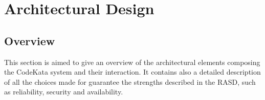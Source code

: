 \clearpage
\section{Architectural Design}
\subsection{Overview}

This section is aimed to give an overview of the architectural elements composing the CodeKata system and their interaction. It contains also a detailed description of all the choices made for guarantee the strengths described in the RASD, such as reliability, security and availability.







